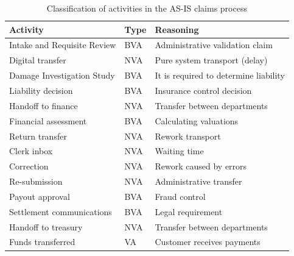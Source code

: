 \begin{table}[H]
\centering
\begin{tabularx}{\textwidth}{@{}p{}p{}X@{}}
\toprule
\textbf{Activity} & \textbf{Type} & \textbf{Reasoning} \\
\midrule
Intake and Requisite Review & BVA & Administrative validation claim \\
Digital transfer & NVA & Pure system transport (delay) \\
Damage Investigation Study & BVA & It is required to determine liability \\
Liability decision & BVA & Insurance control decision \\
Handoff to finance & NVA & Transfer between departments \\
Financial assessment & BVA & Calculating valuations \\
Return transfer & NVA & Rework transport \\
Clerk inbox & NVA & Waiting time \\
Correction & NVA & Rework caused by errors \\
Re-submission & NVA & Administrative transfer \\
Payout approval & BVA & Fraud control \\
Settlement communications & BVA & Legal requirement \\
Handoff to treasury & NVA & Transfer between departments \\
Funds transferred & VA & Customer receives payments \\
\bottomrule
\end{tabularx}
\caption{Classification of activities in the AS-IS claims process}
\label{tab:activity_classification_as_is_claims_process}
\end{table}